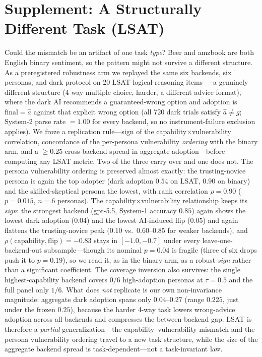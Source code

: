 \documentclass[manuscript,review,anonymous]{acmart}
\begin{document}
\section{Supplement: A Structurally Different Task (LSAT)}
\label{app:lsat}
\label{sec:lsat}

Could the mismatch be an artifact of one task \emph{type}? Beer and amzbook are both English binary
sentiment, so the pattern might not survive a different structure. As a preregistered robustness arm we
replayed the same six backends, six personas, and dark
protocol on 20 LSAT logical-reasoning items~\cite{bansal2021whole}---a genuinely different structure (4-way
multiple choice, harder, a different advice format), where the dark AI recommends a guaranteed-wrong option
and adoption is $\mathrm{final}=\hat a$ against that explicit wrong option (all 720 dark trials satisfy
$\hat a\neq g$; System-2 parse rate $=1.00$ for every backend, so no instrument-failure exclusion applies).
We froze a replication rule---sign of the capability$\times$vulnerability correlation, concordance of the
per-persona vulnerability \emph{ordering} with the binary arm, and a $\ge0.25$ cross-backend spread in
aggregate adoption---before computing any LSAT metric. Two of the three carry over and one does not. The
persona vulnerability ordering is preserved almost exactly: the trusting-novice persona is again the top
adopter (dark adoption $0.54$ on LSAT, $0.90$ on binary) and the skilled-skeptical persona the lowest, with
rank correlation $\rho=0.90$ ($p=0.015$, $n=6$ personas). The capability$\times$vulnerability relationship
keeps its \emph{sign}: the strongest backend (gpt-5.5, System-1 accuracy $0.85$) again shows the lowest dark
adoption ($0.04$) and the lowest AI-induced flip ($0.05$) and again flattens the trusting-novice peak
($0.10$ vs.\ $0.60$--$0.85$ for weaker backends), and $\rho(\text{capability},\text{flip})=-0.83$ stays in
$[-1.0,-0.7]$ under every leave-one-backend-out subsample---though its nominal $p=0.04$ is fragile (three of
six drops push it to $p=0.19$), so we read it, as in the binary arm, as a robust \emph{sign} rather than a
significant coefficient. The coverage inversion also survives: the single highest-capability backend covers
$0/6$ high-adoption personas at $\tau=0.5$ and the full panel only $1/6$. What does \emph{not} replicate is
our own non-invariance magnitude: aggregate dark adoption spans only $0.04$--$0.27$ (range $0.225$, just
under the frozen $0.25$), because the harder 4-way task lowers wrong-advice adoption across all backends and
compresses the between-backend gap. LSAT is therefore a \emph{partial} generalization---the
capability--vulnerability mismatch and the persona vulnerability ordering travel to a new task structure,
while the size of the aggregate backend spread is task-dependent---not a task-invariant law.
\end{document}
